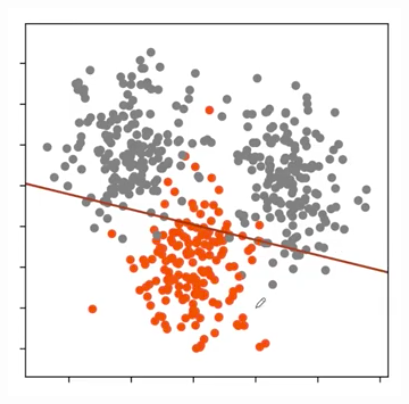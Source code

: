 \begin{frameex}
\begin{figure}[H]
\includegraphics[scale=0.4]{onevsrest4.png}
\end{figure}


\end{frameex}
